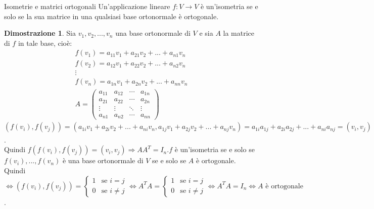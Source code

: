 \documentclass[a4paper]{article}
\theoremstyle{definition}
\newtheorem*{dimm}{Dimostrazione}
\begin{document}
	\begin{teo}{Isometrie e matrici ortogonali}
		Un'applicazione lineare $f: V \to V$ è un'isometria se e solo se la sua matrice in una qualsiasi base ortonormale è ortogonale.
	\end{teo}
	\begin{dimm}
		Sia $v_1, v_2, ..., v_n$ una base ortonormale di $V$ e sia $A$ la matrice di $f$ in tale base, cioè:
		\begin{align*}
			f(v_1) = a_{11}v_1 + a_{21}v_2 + ... + a_{n1}v_n \\
			f(v_2) = a_{12}v_1 + a_{22}v_2 + ... + a_{n2}v_n \\
			\vdots \\
			f(v_n) = a_{1n}v_1 + a_{2n}v_2 + ... + a_{nn}v_n \\
			A = \begin{pmatrix}
				a_{11} & a_{12} & \cdots & a_{1n} \\
				a_{21} & a_{22} & \cdots & a_{2n} \\
				\vdots & \vdots & \ddots & \vdots \\
				a_{n1} & a_{n2} & \cdots & a_{nn}
			\end{pmatrix}
		\end{align*}
		$(f(v_i), f(v_j)) = (a_{1i}v_1 + a_{2i}v_2 + ... + a_{ni}v_n, a_{1j}v_1 + a_{2j}v_2 + ... + a_{nj}v_n) = a_{1i}a_{1j} + a_{2i}a_{2j} + ... + a_{ni}a_{nj} = (v_i, v_j) = (AA^T)_{ij}$. \\
		Quindi $f(f(v_i), f(v_j)) = (v_i, v_j) \Rightarrow AA^T = I_n. f$ è un'isometria se e solo se $f(v_i), ..., f(v_n)$ è una base ortonormale di $V$ se e solo se $A$ è ortogonale. \\
		Quindi $\Leftrightarrow (f(v_i), f(v_j)) = \begin{cases}
			1 & \text{se } i = j \\
			0 & \text{se } i \ne j
		\end{cases} \Leftrightarrow A^TA = \begin{cases}
			1 & \text{se } i = j \\
			0 & \text{se } i \ne j
		\end{cases} \Leftrightarrow A^TA = I_n \Leftrightarrow A \text{ è ortogonale}$.
	\end{dimm}
	
\end{document}
